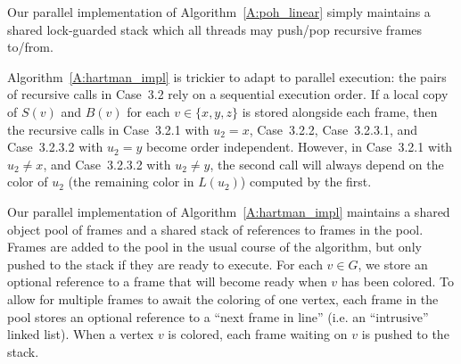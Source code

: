 \documentclass[12pt,letterpaper]{article}
\theoremstyle{plain}
\theoremstyle{definition}
\theoremstyle{break}
\begin{document}
Our parallel implementation of Algorithm~\ref{A:poh_linear} simply maintains a
shared lock-guarded stack which all threads may push/pop recursive
frames to/from.

Algorithm~\ref{A:hartman_impl} is trickier to adapt to
parallel execution: the pairs of recursive calls in Case~3.2
rely on a sequential execution order.
If a local copy of
$S(v)$ and $B(v)$ for each $v\in\{x, y,z\}$ is stored alongside
each frame, then the recursive calls in
Case~3.2.1 with $u_2=x$, Case~3.2.2,
Case~3.2.3.1, and Case~3.2.3.2 with $u_2=y$ become order independent.
However, in Case~3.2.1 with $u_2\ne x$, and Case~3.2.3.2 with $u_2\ne y$,
the second call will always depend on the color of $u_2$ (the
remaining color in $L(u_2)$)
computed by the first.

Our parallel implementation of Algorithm~\ref{A:hartman_impl}
maintains a shared object pool
of frames and a shared stack of references to frames in the pool.
Frames are added to
the pool in the usual course of the algorithm, but
only pushed to the stack if they are ready to execute.
For each $v\in G$, we store an optional reference
to a frame that will become ready when $v$ has been colored. To allow for
multiple frames to await the coloring of one vertex, each frame in the
pool stores an optional reference to a ``next frame in line''
(i.e. an ``intrusive'' linked list).
When a vertex $v$ is colored, each frame waiting on $v$
is pushed to the stack.
\end{document}
